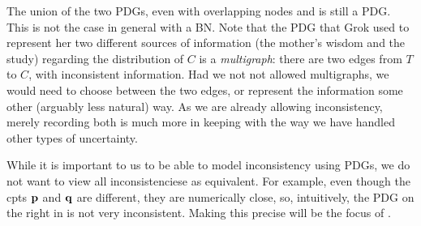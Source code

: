 \documentclass{article}
\newcommand{\MN}{PDG}
\newcommand{\MNs}{\MN s}
\numberwithin{equation}{section}
\begin{document}
\begin{example}
		The union of the two \MNs, even with overlapping nodes
                and is still a \MN. This is not the case 
                in general with a BN. Note that the PDG that Grok used
                to          represent her two 
                different sources of information (the mother's wisdom
                and the study) regarding the distribution of
               $C$ is a \emph{multigraph}: there are two 
                edges from $T$ to $C$, with inconsistent information.
                Had we not not allowed multigraphs, we would need to
                choose between the two edges, or represent the
                information some other (arguably less natural) way.
                As we are already allowing inconsistency,
                merely recording both is much more in keeping with the
                way we have handled other types of uncertainty. 
	\end{example}

While it is important to us to be able to model inconsistency using
PDGs, we do not want to view all inconsistenciese as equivalent.  For
example,
even though the cpts $\mathbf p$ and $\mathbf q$ are different, they
are numerically close, so, intuitively, the PDG on the right in
 is not very inconsistent.  
Making this precise will be the focus of	
.
\end{document}
